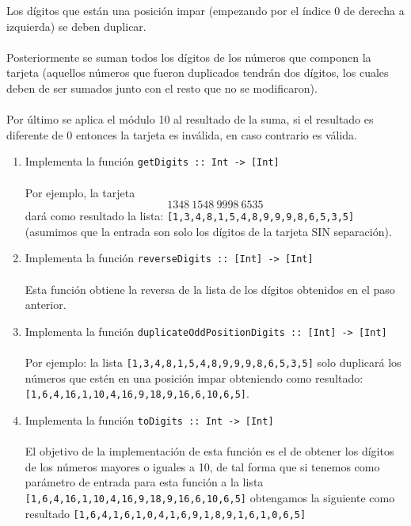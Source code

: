 \begin{exercise}
        Los dígitos que están una posición impar (empezando por el índice 0 de derecha a izquierda) se deben duplicar. \\\\
        Posteriormente se suman todos los dígitos de los números que componen la tarjeta (aquellos números que fueron duplicados tendrán dos dígitos, los cuales deben de ser sumados junto con el resto que no se modificaron).\\\\
        Por último se aplica el módulo 10 al resultado de la suma, si el resultado es diferente de 0 entonces la tarjeta es inválida, en caso contrario es válida.\\
        \begin{enumerate} 
           \item  Implementa la función {\tt getDigits :: Int ->\ [Int]} \\\\
                  Por ejemplo, la tarjeta \[1348\ 1548\ 9998\ 6535\] dará como resultado la lista: \texttt{[1,3,4,8,1,5,4,8,9,9,9,8,6,5,3,5]} \\
                  (asumimos que la entrada son solo los dígitos de la tarjeta SIN separación).\\
           \item  Implementa la función \texttt{reverseDigits ::  [Int] ->\ [Int]} \\\\
                  Esta función obtiene la reversa de la lista de los dígitos obtenidos en el paso anterior.\\
           \item  Implementa la función \texttt{duplicateOddPositionDigits ::  [Int] ->\ [Int]} \\\\
                  Por ejemplo: la lista \texttt{[1,3,4,8,1,5,4,8,9,9,9,8,6,5,3,5]} solo duplicará los números que estén en una posición impar obteniendo como resultado: \texttt{[1,6,4,16,1,10,4,16,9,18,9,16,6,10,6,5]}. \\
           \item  Implementa la función \texttt{toDigits :: Int ->\ [Int]}\\\\
                  El objetivo de la implementación de esta función es el de obtener los dígitos de los números mayores o iguales a 10, de tal forma que si tenemos como parámetro de entrada para esta función a la lista \texttt{[1,6,4,16,1,10,4,16,9,18,9,16,6,10,6,5]} obtengamos la siguiente como resultado \texttt{[1,6,4,1,6,1,0,4,1,6,9,1,8,9,1,6,1,0,6,5]} \\

\end{enumerate}
\end{exercise}
